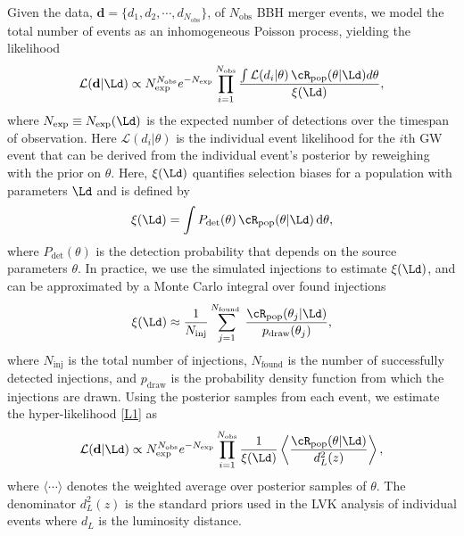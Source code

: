 \documentclass[
reprint,           %
superscriptaddress,%
amsmath,           %
amssymb,           %
aps,               %
prd,               %
notitlepage,       %
longbibliography,  %
floatfix,          %
nofootinbib,
]{revtex4-1}
\def\e{\begin{equation}}
\def\q{\end{equation}}
\begin{document}
Given the data, $\textbf{d} = \{d_1, d_2, \cdots, d_{N_{\mathrm{obs}}}\}$, of $N_{\mathrm{obs}}$ BBH merger events, we model the total number of events as an inhomogeneous Poisson process, yielding the likelihood \cite{Loredo:2004nn,Thrane:2018qnx,Mandel:2018mve}
\begin{equation}\label{L1}
	\mathcal{L}(\textbf{d}|\Ld) \propto N_{\mathrm{exp}}^{N_{\mathrm{obs}}} e^{-N_{\mathrm{exp}}} \prod_{i=1}^{N_{\mathrm{obs}}} \frac{\int \mathcal{L} (d_{i}| \theta)\, \cR_{\mathrm{pop}}(\theta|\Ld) d \theta}{\xi(\Ld)},
\end{equation}
where $N_{\exp}\equiv N_{\exp}(\Ld)$ is the expected number of detections over the timespan of observation. Here $\mathcal{L} (d_{i}|\theta)$ is the individual event likelihood for the $i$th GW event that can be derived from the individual event's posterior by reweighing with the prior on $\theta$. Here, $\xi(\Ld)$ quantifies selection biases for a population with parameters $\Ld$ and is defined by
\e\label{xi}
\xi(\Ld) = \int P_{\mathrm{det}}(\theta)\, \cR_{\mathrm{pop}}(\theta|\Ld)\, \mathrm{d} \theta,
\q
where $P_{\text{det}}(\theta)$ is the detection probability that depends on the source parameters $\theta$.
In practice, we use the simulated injections \cite{ligo_scientific_collaboration_and_virgo_2021_5546676} to estimate $\xi(\Ld)$, and  can be approximated by a Monte Carlo integral over found injections \cite{LIGOScientific:2021psn}
\begin{equation}
	\xi(\Ld) \approx \frac{1}{N_{\mathrm{inj}}} \sum_{j=1}^{N_{\text {found }}} \frac{\cR_{\mathrm{pop}}(\theta_{j} | \Ld)}{p_{\mathrm{draw}}(\theta_j)},
\end{equation}
where $N_{\text{inj}}$ is the total number of injections, $N_{\text{found}}$ is the number of successfully detected injections, and $p_{\mathrm{draw}}$ is the probability density function from which the injections are drawn.
Using the posterior samples from each event, we estimate the hyper-likelihood \eqref{L1} as
\begin{equation}\label{L2}
	\mathcal{L}(\textbf{d}|\Ld) \propto N_{\mathrm{exp}}^{N_{\mathrm{obs}}} e^{-N_{\mathrm{exp}}} \prod_{i=1}^{N_{\mathrm{obs}}} \frac{1}{\xi(\Ld)} \left\langle \frac{\cR_{\mathrm{pop}}(\theta|\Ld)}{d_L^2(z)} \right\rangle,
\end{equation}
where $\langle\cdots\rangle$ denotes the weighted average over posterior samples of $\theta$. The denominator $d_L^2(z)$ is the standard priors used in the LVK analysis of individual events where $d_L$ is the luminosity distance.
\end{document}
